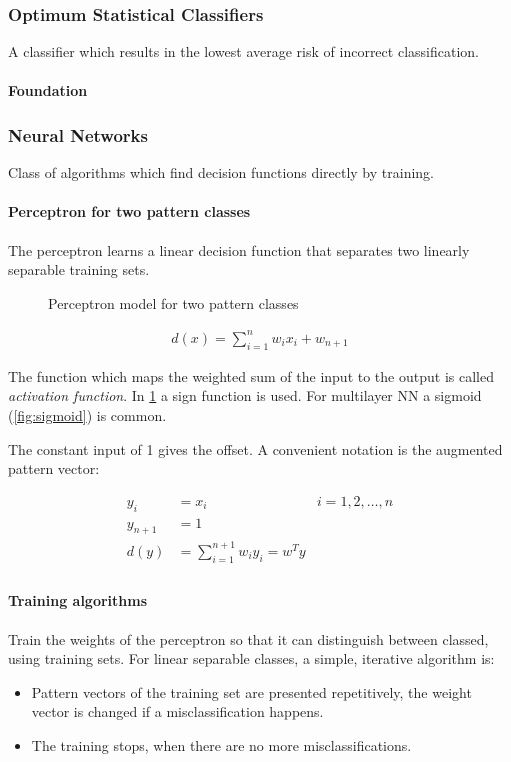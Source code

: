 \subsubsection{Optimum Statistical Classifiers}
A classifier which results in the lowest average risk of incorrect classification.
\paragraph{Foundation}


\subsubsection{Neural Networks}

Class of algorithms which find decision functions directly by training.

\paragraph{Perceptron for two pattern classes}

The perceptron learns a linear decision function that separates two linearly separable training sets.

\begin{figure}[htb]
\centering

\caption{Perceptron model for two pattern classes}
\label{fig:perceptron}
\end{figure}
\begin{align*}
d(x) = \sum_{i=1}^nw_ix_i + w_{n+1}
\end{align*}

The function which maps the weighted sum of the input to the output is called \emph{activation function}.
In \ref{fig:perceptron} a sign function is used.
For multilayer NN a sigmoid (\ref{fig:sigmoid}) is common.

The constant input of 1 gives the offset.
A convenient notation is the augmented pattern vector:

\begin{align*}
y_i &= x_i & i=1,2,\dots,n \\
y_{n+1} &= 1 \\
d(y) &= \sum_{i=1}^{n+1}w_iy_i = w^Ty \\
\end{align*}

\paragraph{Training algorithms}
Train the weights of the perceptron so that it can distinguish between classed, using training sets.
For linear separable classes, a simple, iterative algorithm is:
\begin{itemize}
\item
Pattern vectors of the training set are presented repetitively, the weight vector is changed if a misclassification happens.
\item The training stops, when there are no more misclassifications.
\end{itemize}

